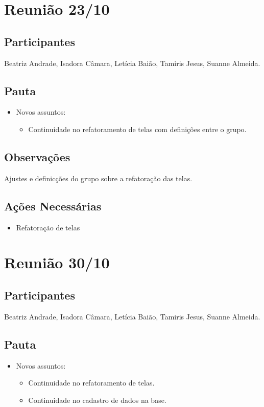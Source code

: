 \begin{apendicesenv}
\section*{Reunião 23/10}

\subsection*{Participantes}
Beatriz Andrade, Isadora Câmara, Letícia Baião, Tamiris Jesus, Suanne Almeida.

\subsection*{Pauta}
\begin{itemize}
    \item Novos assuntos:
    \begin{itemize}
        \item Continuidade no refatoramento de telas com definições entre o grupo.
    \end{itemize}
\end{itemize}

\subsection*{Observações}
Ajustes e definicções do grupo sobre a refatoração das telas.

\subsection*{Ações Necessárias}
\begin{itemize}
    \item Refatoração de telas
\end{itemize}

\section*{Reunião 30/10}

\subsection*{Participantes}
Beatriz Andrade, Isadora Câmara, Letícia Baião, Tamiris Jesus, Suanne Almeida.

\subsection*{Pauta}
\begin{itemize}
    \item Novos assuntos:
    \begin{itemize}
        \item Continuidade no refatoramento de telas.
        \item Continuidade no cadastro de dados na base.
    \end{itemize}
\end{itemize}


\end{apendicesenv}
